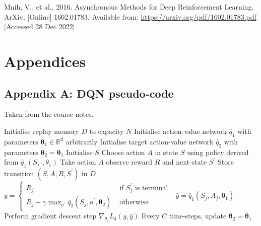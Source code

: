 \documentclass{article}
\begin{document}
\small

Mnih, V., et al., 2016. Asynchronous Methods for Deep Reinforcement Learning. ArXiv, [Online] 1602.01783.
Available from: \url{https://arxiv.org/pdf/1602.01783.pdf} [Accessed 28 Dec 2022]

\normalsize
\newpage
\section*{Appendices}
\subsection*{Appendix A: DQN pseudo-code}
\label{dqn_pseudo}
Taken from the course notes.
\begin{algorithmic}[1]
\State Initialise replay memory $D$ to capacity $N$
\State Initialise action-value network $\hat{q}_{1}$ with parameters $\boldsymbol{\theta}_{1} \in \mathbb{R}^{d}$ arbitrarily
\State Initialise target action-value network $\hat{q}_{2}$ with parameters $\boldsymbol{\theta}_{2}=\boldsymbol{\theta}_{1}$
    \State $\text{Initialise } S$
        \State Choose action $A$ in state $S$ using policy derived from  $\hat{q}_{1}\left(S, \cdot, \theta_{1}\right)$
        \State Take action $A$ observe reward $R$ and next-state $S^{\prime}$
        \State Store transition $\left(S, A, R, S^{\prime}\right)$ in $D$
            \State $y= \begin{cases}R_{j} & \text { if } S_{j}^{\prime} \text { is terminal } \\ R_{j}+\gamma \max _{a^{\prime}} \hat{q}_{2}\left(S_{j}^{\prime}, a^{\prime}, \boldsymbol{\theta}_{2}\right) & \text { otherwise }\end{cases}$
            \State $\hat{y}=\hat{q}_{1}\left(S_{j}, A_{j}, \boldsymbol{\theta}_{1}\right)$
            \State Perform gradient descent step $\nabla_{\theta_{1}} L_{\delta}(y, \hat{y})$
        \EndFor
    \State Every $C$ time-steps, update $\boldsymbol{\theta}_{2}=\boldsymbol{\theta}_{1}$
    \EndFor
\EndFor
\end{algorithmic}
\end{document}
